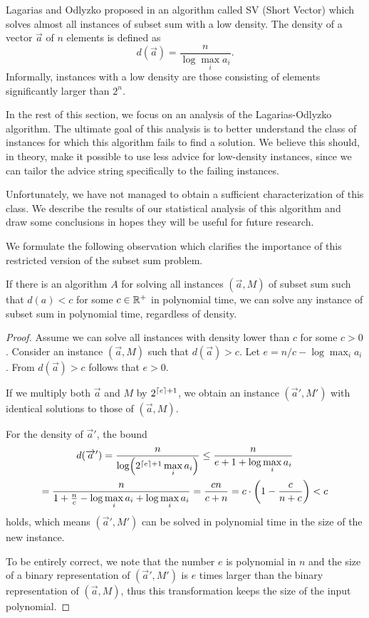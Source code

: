 Lagarias and Odlyzko proposed in \cite{lagarias-odlyzko} an algorithm
called SV (Short Vector) which solves almost all instances of subset sum
with a low density. The density of a vector $\vec{a}$ of $n$ elements is
defined as
$$
    d(\vec{a}) = \frac{n}{\log\max\limits_ia_i}.
$$
Informally, instances with a low density are those consisting of elements
significantly larger than $2^n$.

In the rest of this section, we focus on an analysis of the
Lagarias-Odlyzko algorithm. The ultimate goal of this analysis is to
better understand the class of instances for which this algorithm fails to
find a solution. We believe this should, in theory, make it possible to
use less advice for low-density instances, since we can tailor the advice
string specifically to the failing instances.

Unfortunately, we have not managed to obtain a sufficient characterization
of this class. We describe the results of our statistical analysis of this
algorithm and draw some conclusions in hopes they will be useful for
future research.

We formulate the following observation which clarifies the importance of
this restricted version of the subset sum problem.

\begin{observation}\label{observation:subset-sum-low-density-reduction}
    If there is an algorithm $A$ for solving all instances $(\vec{a}, M)$
    of subset sum such that $d(a) < c$ for some $c \in \mathbb{R}^+$ in polynomial
    time, we can solve any instance of subset sum in polynomial time,
    regardless of density.
\end{observation}

\begin{proof}
    Assume we can solve all instances with density lower than $c$ for some
    $c > 0$. Consider an instance $(\vec{a}, M)$ such that $d(\vec{a}) >
    c$. Let $e = n/c - \log\max_ia_i$. From $d(\vec{a}) > c$ follows that
    $e > 0$.
    
    If we multiply both $\vec{a}$ and $M$ by $2^{\lceil e\rceil+1}$, we obtain
    an instance $(\vec{a}', M')$ with identical solutions to those of
    $(\vec{a}, M)$.

    For the density of $\vec{a}'$, the bound
    \begin{multline*}
        d(\vec{a}')
        = \frac{n}{\log\paren*{2^{\ceil{e}+1} \max\limits_ia_i}}
        \leq \frac{n}{e + 1 + \log\max\limits_ia_i}
        \\
        = \frac{n}{1 + \frac{n}{c} - \log\max\limits_ia_i + \log\max\limits_ia_i}
        = \frac{cn}{c + n}
        = c \cdot \paren*{1 - \frac{c}{n+c}} < c
    \end{multline*}
    holds, which means $(\vec{a}', M')$ can be solved in polynomial time
    in the size of the new instance.

    To be entirely correct, we note that the number $e$ is polynomial in
    $n$ and the size of a binary representation of $(\vec{a}', M')$ is $e$
    times larger than the binary representation of $(\vec{a}, M)$,
    thus this transformation keeps the size of the input polynomial.
\end{proof}

